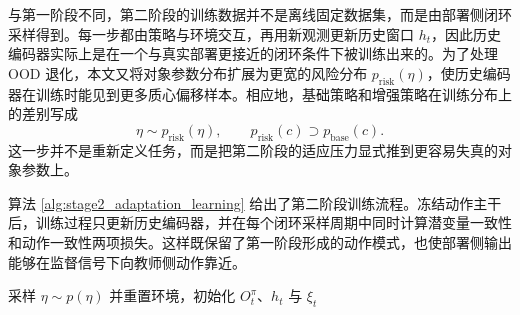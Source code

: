 与第一阶段不同，第二阶段的训练数据并不是离线固定数据集，而是由部署侧闭环采样得到。每一步都由策略与环境交互，再用新观测更新历史窗口 \(h_t\)，因此历史编码器实际上是在一个与真实部署更接近的闭环条件下被训练出来的。为了处理 OOD 退化，本文又将对象参数分布扩展为更宽的风险分布 \(p_{\mathrm{risk}}(\eta)\)，使历史编码器在训练时能见到更多质心偏移样本。相应地，基础策略和增强策略在训练分布上的差别写成
\begin{equation}
\eta \sim p_{\mathrm{risk}}(\eta),
\qquad
p_{\mathrm{risk}}(c)\supset p_{\mathrm{base}}(c).
\end{equation}
这一步并不是重新定义任务，而是把第二阶段的适应压力显式推到更容易失真的对象参数上。

算法 \ref{alg:stage2_adaptation_learning} 给出了第二阶段训练流程。冻结动作主干后，训练过程只更新历史编码器，并在每个闭环采样周期中同时计算潜变量一致性和动作一致性两项损失。这样既保留了第一阶段形成的动作模式，也使部署侧输出能够在监督信号下向教师侧动作靠近。

\begin{algorithm}[H]
  \DontPrintSemicolon
  \caption{第二阶段面向风险对齐的本体历史自适应训练}
  \label{alg:stage2_adaptation_learning}
  \BlankLine
  采样 \(\eta\sim p(\eta)\) 并重置环境，初始化 \(O_t^\pi\)、\(h_t\) 与 \(\xi_t\)\;
\end{algorithm}

